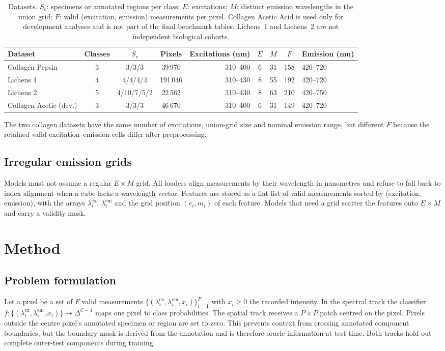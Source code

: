 \documentclass[journal]{IEEEtran}
\newcommand{\lex}{\lambda^{\mathrm{ex}}}
\newcommand{\lem}{\lambda^{\mathrm{em}}}
\begin{document}
\begin{table}[!t]
\centering
\caption{Datasets. $S_c$: specimens or annotated regions per class; $E$: excitations; $M$: distinct emission wavelengths in the union grid; $F$: valid (excitation, emission) measurements per pixel. Collagen Acetic Acid is used only for development analyses and is not part of the final benchmark tables. Lichens~1 and Lichens~2 are not independent biological cohorts.}
\label{tab:data}
\small
\begin{tabular}{lcccrcccl}
\toprule
Dataset & Classes & $S_c$ & Pixels & Excitations (nm) & $E$ & $M$ & $F$ & Emission (nm) \\
\midrule
Collagen Pepsin & 3 & 3/3/3 & 39\,970 & 310--400 & 6 & 31 & 158 & 420--720 \\
Lichens 1 & 4 & 4/4/4/4 & 191\,046 & 310--430 & 8 & 55 & 192 & 420--720 \\
Lichens 2 & 5 & 4/10/7/5/2 & 22\,562 & 310--430 & 8 & 63 & 210 & 420--750 \\
\midrule
Collagen Acetic (dev.) & 3 & 3/3/3 & 46\,670 & 310--400 & 6 & 31 & 149 & 420--720 \\
\bottomrule
\end{tabular}
\end{table}

The two collagen datasets have the same number of excitations, union-grid size and nominal emission range, but different $F$ because the retained valid excitation--emission cells differ after preprocessing.

\subsection{Irregular emission grids}
Models must not assume a regular $E\times M$ grid. All loaders align measurements by their wavelength in nanometres and refuse to fall back to index alignment when a cube lacks a wavelength vector. Features are stored as a flat list of valid measurements sorted by (excitation, emission), with the arrays $\lex_i$, $\lem_i$ and the grid position $(e_i,m_i)$ of each feature. Models that need a grid scatter the features onto $E\times M$ and carry a validity mask.

\section{Method}
\subsection{Problem formulation}
Let a pixel be a set of $F$ valid measurements $\{(\lex_i,\lem_i,x_i)\}_{i=1}^{F}$ with $x_i\ge 0$ the recorded intensity. In the spectral track the classifier $f:\{(\lex_i,\lem_i,x_i)\}\to \Delta^{C-1}$ maps one pixel to class probabilities. The spatial track receives a $P\times P$ patch centred on the pixel. Pixels outside the centre pixel's annotated specimen or region are set to zero. This prevents context from crossing annotated component boundaries, but the boundary mask is derived from the annotation and is therefore oracle information at test time. Both tracks hold out complete outer-test components during training.
\end{document}
